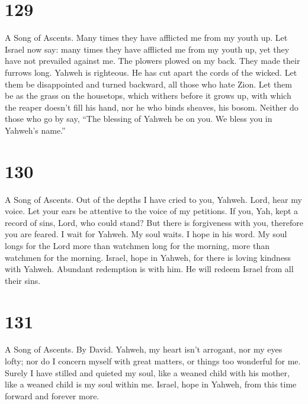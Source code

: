 \hypertarget{section-121}{%
\section{129}\label{section-121}}

A Song of Ascents.  Many times they have afflicted me from
my youth up. Let Israel now say:  many times they have
afflicted me from my youth up, yet they have not prevailed against me.
 The plowers plowed on my back. They made their furrows
long.  Yahweh is righteous. He has cut apart the cords of
the wicked.  Let them be disappointed and turned backward,
all those who hate Zion.  Let them be as the grass on the
housetops, which withers before it grows up,  with which
the reaper doesn't fill his hand, nor he who binds sheaves, his bosom.
 Neither do those who go by say, ``The blessing of Yahweh
be on you. We bless you in Yahweh's name.''

\hypertarget{section-122}{%
\section{130}\label{section-122}}

A Song of Ascents.  Out of the depths I have cried to you,
Yahweh.  Lord, hear my voice. Let your ears be attentive
to the voice of my petitions.  If you, Yah, kept a record
of sins, Lord, who could stand?  But there is forgiveness
with you, therefore you are feared.  I wait for Yahweh. My
soul waits. I hope in his word.  My soul longs for the
Lord more than watchmen long for the morning, more than watchmen for the
morning.  Israel, hope in Yahweh, for there is loving
kindness with Yahweh. Abundant redemption is with him.  He
will redeem Israel from all their sins.

\hypertarget{section-123}{%
\section{131}\label{section-123}}

A Song of Ascents. By David.  Yahweh, my heart isn't
arrogant, nor my eyes lofty; nor do I concern myself with great matters,
or things too wonderful for me.  Surely I have stilled and
quieted my soul, like a weaned child with his mother, like a weaned
child is my soul within me.  Israel, hope in Yahweh, from
this time forward and forever more.

